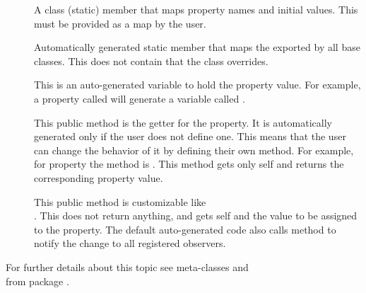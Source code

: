 \begin{description}

\item[\OPvar] A class (static) member that maps property names and
initial values. This must be provided as a map by the user.

\item[\OPdvar] Automatically generated static member that maps the 
\OPS exported by all base classes. This does not contain \OPS that 
the class overrides. 

\item[] This is an
  auto-generated variable to hold the property value. For example, a
  property called  will generate a variable called
  .

\item[] This public method
  is the getter for the property. It is automatically generated only
  if the user does not define one. This means that the user can change
  the behavior of it by defining their own method.  For example, for
  property  the method is .  This
  method gets only self and returns the corresponding property value.

\item[] This public method
  is customizable like \\
  .  This does not return
  anything, and gets self and the value to be assigned to the
  property. The default auto-generated code also calls method
   to notify the
  change to all registered observers.

\end{description}

For further details about this topic see meta-classes 
and \\
 from package .


